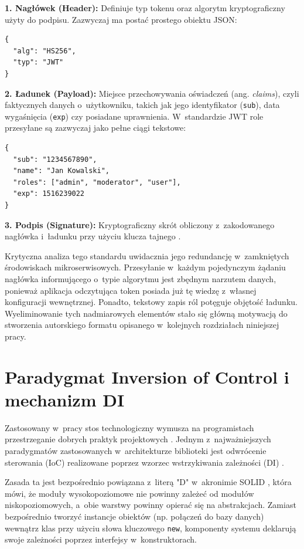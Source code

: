 \documentclass{SGGW-thesis}
\begin{document}
\textbf{1. Nagłówek (Header):} Definiuje typ tokenu oraz algorytm kryptograficzny użyty do podpisu. Zazwyczaj ma postać prostego obiektu JSON:
\begin{lstlisting}
{
  "alg": "HS256",
  "typ": "JWT"
}
\end{lstlisting}

\clearpage
\textbf{2. Ładunek (Payload):} Miejsce przechowywania oświadczeń (ang. \textit{claims}), czyli faktycznych danych o~użytkowniku, takich jak jego identyfikator (\texttt{sub}), data wygaśnięcia (\texttt{exp}) czy posiadane uprawnienia. W~standardzie JWT role przesyłane są zazwyczaj jako pełne ciągi tekstowe:
\begin{lstlisting}
{
  "sub": "1234567890",
  "name": "Jan Kowalski",
  "roles": ["admin", "moderator", "user"],
  "exp": 1516239022
}
\end{lstlisting}

\textbf{3. Podpis (Signature):} Kryptograficzny skrót obliczony z~zakodowanego nagłówka i~ładunku przy użyciu klucza tajnego \cite{rfc2104}.

Krytyczna analiza tego standardu uwidacznia jego redundancję w~zamkniętych środowiskach mikroserwisowych. Przesyłanie w~każdym pojedynczym żądaniu nagłówka informującego o~typie algorytmu jest zbędnym narzutem danych, ponieważ aplikacja odczytująca token posiada już tę wiedzę z~własnej konfiguracji wewnętrznej. Ponadto, tekstowy zapis ról potęguje objętość ładunku. Wyeliminowanie tych nadmiarowych elementów stało się główną motywacją do stworzenia autorskiego formatu opisanego w~kolejnych rozdziałach niniejszej pracy.

\section{Paradygmat Inversion of Control i mechanizm DI}

Zastosowany w~pracy stos technologiczny wymusza na programistach przestrzeganie dobrych praktyk projektowych \cite{gof1994}. Jednym z~najważniejszych paradygmatów zastosowanych w~architekturze biblioteki jest odwrócenie sterowania (IoC) realizowane poprzez wzorzec wstrzykiwania zależności (DI) \cite{di_net}. 

Zasada ta jest bezpośrednio powiązana z~literą "D" w~akronimie SOLID \cite{cleancode}, która mówi, że moduły wysokopoziomowe nie powinny zależeć od modułów niskopoziomowych, a~obie warstwy powinny opierać się na abstrakcjach. Zamiast bezpośrednio tworzyć instancje obiektów (np. połączeń do bazy danych) wewnątrz klas przy użyciu słowa kluczowego \texttt{new}, komponenty systemu deklarują swoje zależności poprzez interfejsy w~konstruktorach.
\end{document}
